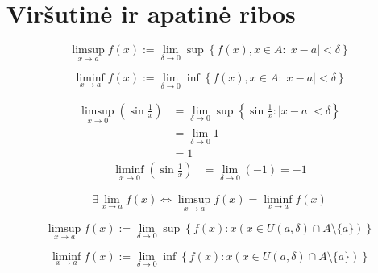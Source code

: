 \section{Viršutinė ir apatinė ribos}

\begin{defn}
  \begin{equation*}
    \limsup _{x \to a} f(x) := 
      \lim _{\delta \to 0} 
      \sup \left\{ f(x), x \in A : |x - a| < \delta \right\}
  \end{equation*}
\end{defn}

\begin{defn}
  \begin{equation*}
    \liminf _{x \to a} f(x) :=
      \lim _{\delta \to 0}
      \inf \left\{ f(x), x \in A : |x - a| < \delta \right\}
  \end{equation*}
\end{defn}

\begin{exmp}
  \begin{align*}
    \limsup _{x \to 0} \left( \sin \frac{1}{x} \right) 
    &= \lim _{\delta \to 0} \sup 
      \left\{ \sin \frac{1}{x} : |x - a| < \delta \right\} \\
    &= \lim _{\delta \to 0} 1 \\
    &= 1
  \end{align*}
  \begin{align*}
    \liminf _{x \to 0} \left( \sin \frac{1}{x} \right) 
    &= \lim _{\delta \to 0} (-1) = -1
  \end{align*}
\end{exmp}

\begin{prop}
  \begin{equation*}
    \exists \lim _{x \to a} f(x) \iff
    \limsup _{x \to a} f(x) = \liminf _{x \to a} f(x)
  \end{equation*}
\end{prop}

\begin{defn}
  \begin{equation*}
    \limsup _{x \to a} f(x) :=
      \lim _{\delta \to 0}
      \sup \left\{ f(x) : x 
        (x \in U(a, \delta) \cap A \setminus \{a\}) 
        \right\}
  \end{equation*}
\end{defn}

\begin{defn}
  \begin{equation*}
    \liminf _{x \to a} f(x) :=
      \lim _{\delta \to 0}
      \inf \left\{ f(x) : x 
        (x \in U(a, \delta) \cap A \setminus \{a\}) 
        \right\}
  \end{equation*}
\end{defn}

